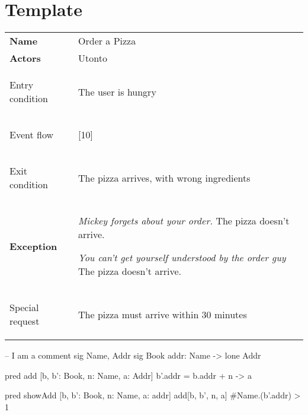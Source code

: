 \chapter{Template}

\begin{table}
    \label{tab:uc_1}
    \caption{Use case 1}

    \centering\sffamily
    \begin{longtabu} to 
        \toprule
        Name &
        Order a Pizza \\
        Actors &
        Utonto \\
        \midrule

        Entry condition &
        The user is hungry \\
        \midrule

        Event flow &
        [10] \\
        \midrule

        Exit condition &
        The pizza arrives, with wrong ingredients \\

        \midrule
        Exception &
            \emph{Mickey forgets about your order.}
            The pizza doesn't arrive.

            \emph{You can't get yourself understood by the order guy}
            The pizza doesn't arrive. \\
        \midrule

        Special request &
        The pizza must arrive within 30 minutes \\
        \bottomrule
    \end{longtabu}

    \begin{alloy}
-- I am a comment
sig Name, Addr {}
sig Book {
	addr: Name -> lone Addr
}

pred add [b, b': Book, n: Name, a: Addr] {
	b'.addr = b.addr + n -> a
}

pred showAdd [b, b': Book, n: Name, a: addr] {
	add[b, b', n, a]
	#Name.(b'.addr) > 1
}

    \end{alloy}
\end{table}
